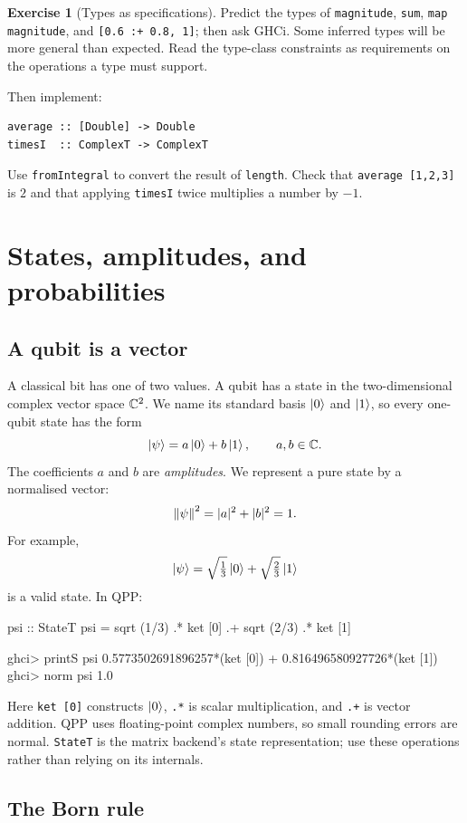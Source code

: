 \documentclass[11pt,a4paper]{article}
\theoremstyle{definition}
\newtheorem{exercise}{Exercise}[section]
\begin{document}
\begin{exercise}[Types as specifications]
Predict the types of \lstinline|magnitude|, \lstinline|sum|,
\lstinline|map magnitude|, and \lstinline|[0.6 :+ 0.8, 1]|; then ask GHCi.
Some inferred types will be more general than expected.  Read the type-class
constraints as requirements on the operations a type must support.

Then implement:
\begin{lstlisting}
average :: [Double] -> Double
timesI  :: ComplexT -> ComplexT
\end{lstlisting}
Use \lstinline|fromIntegral| to convert the result of \lstinline|length|.
Check that \lstinline|average [1,2,3]| is $2$ and that applying
\lstinline|timesI| twice multiplies a number by $-1$.
\end{exercise}

\section{States, amplitudes, and probabilities}
\label{sec:states}

\subsection{A qubit is a vector}

A classical bit has one of two values.  A qubit has a state in the
two-dimensional complex vector space $\mathbb{C}^2$.  We name its standard basis
$\left| 0 \right\rangle$ and $\left| 1 \right\rangle$, so every one-qubit state has the form
\[
  \left| \psi \right\rangle = a\left| 0 \right\rangle+b\left| 1 \right\rangle,
  \qquad a,b\in\mathbb{C}.
\]
The coefficients $a$ and $b$ are \emph{amplitudes}.  We represent a pure state
by a normalised vector:
\[
  \left\| \psi \right\|^2=|a|^2+|b|^2=1.
\]
For example,
\[
  \left| \psi \right\rangle=\sqrt{\tfrac13}\left| 0 \right\rangle+\sqrt{\tfrac23}\left| 1 \right\rangle
\]
is a valid state.  In QPP:
\begin{qppcode}
psi :: StateT
psi = sqrt (1/3) .* ket [0] .+ sqrt (2/3) .* ket [1]

ghci> printS psi
0.5773502691896257*(ket [0]) + 0.816496580927726*(ket [1])
ghci> norm psi
1.0
\end{qppcode}
Here \lstinline|ket [0]| constructs $\left| 0 \right\rangle$, \lstinline|.*| is scalar
multiplication, and \lstinline|.+| is vector addition.  QPP uses
floating-point complex numbers, so small rounding errors are normal.
\lstinline|StateT| is the matrix backend's state representation; use these
operations rather than relying on its internals.

\subsection{The Born rule}
\end{document}
